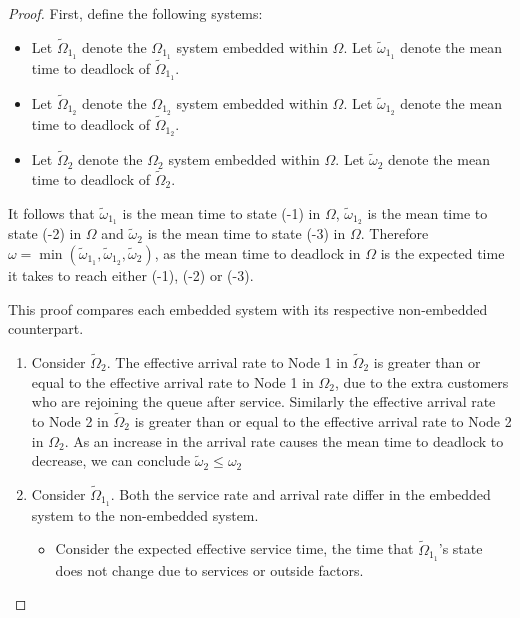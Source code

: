 \documentclass{article}
\begin{document}
\begin{proof}
First, define the following systems:
\begin{itemize}
  \item Let $\widetilde{\Omega}_{1_1}$ denote the $\Omega_{1_1}$ system embedded within $\Omega$. Let $\widetilde{\omega}_{1_1}$ denote the mean time to deadlock of $\widetilde{\Omega}_{1_1}$.
  \item Let $\widetilde{\Omega}_{1_2}$ denote the $\Omega_{1_2}$ system embedded within $\Omega$. Let $\widetilde{\omega}_{1_2}$ denote the mean time to deadlock of $\widetilde{\Omega}_{1_2}$.
  \item Let $\widetilde{\Omega}_2$ denote the $\Omega_2$ system embedded within $\Omega$. Let $\widetilde{\omega}_2$ denote the mean time to deadlock of $\widetilde{\Omega}_2$.
\end{itemize}

It follows that $\widetilde{\omega}_{1_1}$ is the mean time to state (-1) in $\Omega$, $\widetilde{\omega}_{1_2}$ is the mean time to state (-2) in $\Omega$ and $\widetilde{\omega}_2$ is the mean time to state (-3) in $\Omega$.
Therefore $\omega = \min(\widetilde{\omega}_{1_1}, \widetilde{\omega}_{1_2}, \widetilde{\omega}_2)$, as the mean time to deadlock in $\Omega$ is the expected time it takes to reach either (-1), (-2) or (-3).

This proof compares each embedded system with its respective non-embedded counterpart.

\begin{enumerate}

\item Consider $\widetilde{\Omega}_2$.
The effective arrival rate to Node 1 in $\widetilde{\Omega}_2$ is greater than or equal to the effective arrival rate to Node 1 in $\Omega_2$, due to the extra customers who are rejoining the queue after service.
Similarly the effective arrival rate to Node 2 in $\widetilde{\Omega}_2$ is greater than or equal to the effective arrival rate to Node 2 in $\Omega_2$.
As an increase in the arrival rate causes the mean time to deadlock to decrease, we can conclude $\widetilde{\omega}_2 \leq \omega_2$

\item Consider $\widetilde{\Omega}_{1_1}$. Both the service rate and arrival rate differ in the embedded system to the non-embedded system.

\begin{itemize}

\item Consider the expected effective service time, the time that $\widetilde{\Omega}_{1_1}$'s state does not change due to services or outside factors.


\end{itemize}
\end{enumerate}
\end{proof}
\end{document}
